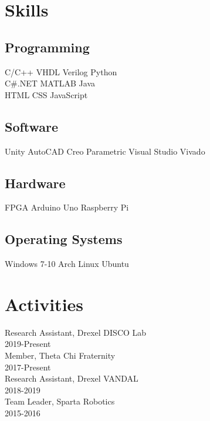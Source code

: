 \documentclass[]{deedy-resume-openfont}
\begin{document}
\begin{minipage}[t]{0.33\textwidth}
\section{Skills}
\subsection{Programming}
C/C++ \textbullet{} VHDL \textbullet{} Verilog \textbullet{} Python \\
C\#.NET \textbullet{} MATLAB \textbullet{} Java \\
HTML \textbullet{} CSS \textbullet{} JavaScript \\

\subsection{Software}
Unity \textbullet{} AutoCAD \textbullet{} Creo Parametric \textbullet{} Visual Studio \textbullet{} Vivado \\

\subsection{Hardware}
FPGA \textbullet{} Arduino Uno \textbullet{} Raspberry Pi \\

\subsection{Operating Systems}
Windows 7-10 \textbullet{} Arch Linux \textbullet{} Ubuntu \\
\sectionsep

\section{Activities}
Research Assistant, Drexel DISCO Lab\\ \hspace{20}2019-Present\\
Member, Theta Chi Fraternity\\ \hspace{20}2017-Present\\
Research Assistant, Drexel VANDAL\\ \hspace{20}2018-2019\\
Team Leader, Sparta Robotics\\ \hspace{20}2015-2016\\

\sectionsep

%
%

\end{minipage} 
\end{document}
